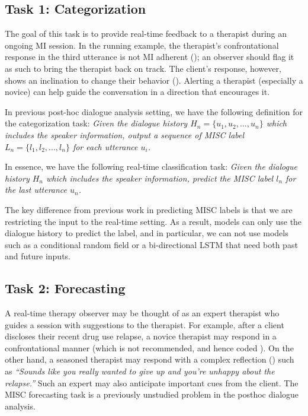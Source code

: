 \subsection{Task 1: Categorization}
\label{ssec:snt:task-categorization}
The goal of this task is to provide real-time feedback to a
therapist during an ongoing MI session. In the running example, the
therapist's confrontational response in the third utterance is not
MI adherent (\MIN); an observer should flag it as such to bring the
therapist back on track. The client's response, however, shows an
inclination to change their behavior (\CHANGE). Alerting a therapist
(especially a novice) can help guide the conversation in a direction
that encourages it.

In previous post-hoc dialogue analysis setting, we have the following
definition for the categorization task: \emph{Given the dialogue
  history $H_n=\{u_{1},u_{2}, ..., u_{n}\}$ which includes the speaker
  information, output a sequence of MISC label
  $L_n=\{l_{1}, l_{2}, ..., l_{n}\}$ for each utterance $u_i$.}

In essence, we have the following real-time classification task:
\emph{Given the dialogue history $H_n$ which includes the speaker
  information, predict the MISC label $l_n$ for the last utterance
  $u_n$.}

The key difference from previous work in predicting MISC labels is
that we are restricting the input to the real-time setting. As a
result, models can only use the dialogue history to predict the label,
and in particular, we can not use models such as a conditional random
field or a bi-directional LSTM that need both past and future inputs.




\subsection{Task 2: Forecasting}
\label{ssec:snt:task-forcasting}
A real-time therapy observer may be thought of as an expert
therapist who guides a session with suggestions to the therapist.
For example, after a client discloses their recent drug use
relapse, a novice therapist may respond in a confrontational manner
(which is not recommended, and hence coded \MIN). On the other
hand, a seasoned therapist may respond with a complex reflection
(\REC) such as \emph{``Sounds like you really wanted to give up and
  you're unhappy about the relapse.''}
Such an expert may also anticipate important cues
from the client.%
The MISC forecasting task is a previously unstudied problem in the
posthoc dialogue analysis.

